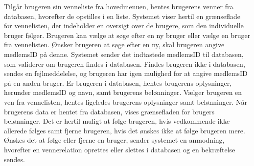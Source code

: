 \noindent
Tilgår brugeren sin venneliste fra hovedmenuen, hentes brugerens venner fra databasen, hvorefter de opstilles i en liste. Systemet viser hertil en grænseflade for vennelisten, der indeholder en oversigt over de brugere, som den individuelle bruger følger. Brugeren kan vælge at søge efter en ny bruger eller vælge en bruger fra vennelisten. Ønsker brugeren at søge efter en ny, skal brugeren angive medlemsID på denne. Systemet sender det indtastede medlemsID til databasen, som validerer om brugeren findes i databasen. Findes brugeren ikke i databasen, sendes en fejlmeddelelse, og brugeren har igen mulighed for at angive medlemsID på en anden bruger. Er brugeren i databasen, hentes brugerens oplysninger, herunder medlemsID og navn, samt brugerens belønninger. Vælger brugeren en ven fra vennelisten, hentes ligeledes brugerens oplysninger samt belønninger. Når brugerens data er hentet fra databasen, vises grænsefladen for brugers belønninger. Det er hertil muligt at følge brugeren, hvis vedkommende ikke allerede følges samt fjerne brugeren, hvis det ønskes ikke at følge brugeren mere. Ønskes det at følge eller fjerne en bruger, sender systemet en anmodning, hvorefter en vennerelation oprettes eller slettes i databasen og en bekræftelse sendes. 




